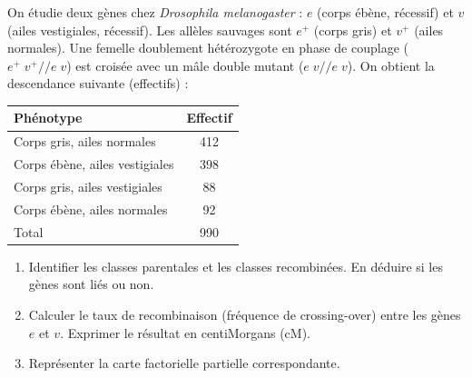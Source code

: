 \documentclass[11pt]{article}
\newcommand{\cle}[1]{{\popxbold\color{popdark}#1}}
\begin{document}
\begin{exercice}
On étudie deux gènes chez \emph{Drosophila melanogaster} : $e$ (corps ébène, récessif) et $v$ (ailes vestigiales, récessif). Les allèles sauvages sont $e^+$ (corps gris) et $v^+$ (ailes normales).
Une femelle doublement hétérozygote en phase de couplage ($e^+\;v^+ // e\;v$) est croisée avec un mâle double mutant ($e\;v // e\;v$).
On obtient la descendance suivante (effectifs) :
\begin{center}
\begin{tabular}{|l|c|}\hline
\rowcolor{popblueL} Phénotype & Effectif \\ \hline
Corps gris, ailes normales & 412 \\
Corps ébène, ailes vestigiales & 398 \\
Corps gris, ailes vestigiales & 88 \\
Corps ébène, ailes normales & 92 \\ \hline
Total & 990 \\ \hline
\end{tabular}
\end{center}
\begin{enumerate}
    \item Identifier les classes parentales et les classes recombinées. En déduire si les gènes sont liés ou non.
    \item Calculer le taux de recombinaison (fréquence de crossing-over) entre les gènes $e$ et $v$. Exprimer le résultat en \cle{centiMorgans (cM)}.
    \item Représenter la carte factorielle partielle correspondante.
\end{enumerate}
\end{exercice}
\end{document}
